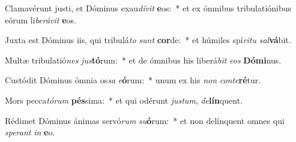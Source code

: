 \item Clamavérunt justi, et Dóminus exau\textit{dí}\textit{vit} \textbf{e}os:~* et ex ómnibus tribulatiónibus eórum li\textit{be}\textit{rá}\textit{vit} \textbf{e}os.
\item Juxta est Dóminus iis, qui tribulá\textit{to} \textit{sunt} \textbf{cor}de:~* et húmiles spí\textit{ri}\textit{tu} \textit{sal}\textbf{vá}bit.
\item Multæ tribulatió\textit{nes} \textit{jus}\textbf{tó}rum:~* et de ómnibus his liberá\textit{bit} \textit{e}\textit{os} \textbf{Dó}\textbf{mi}nus.
\item Custódit Dóminus ómnia os\textit{sa} \textit{e}\textbf{ó}rum:~* unum ex his \textit{non} \textit{con}\textit{te}\textbf{ré}tur.
\item Mors pecca\textit{tó}\textit{rum} \textbf{pés}sima:~* et qui odérunt \textit{jus}\textit{tum}, \textit{de}\textbf{lín}quent.
\item Rédimet Dóminus ánimas servó\textit{rum} \textit{su}\textbf{ó}rum:~* et non delínquent omnes qui \textit{spe}\textit{rant} \textit{in} \textbf{e}o.
